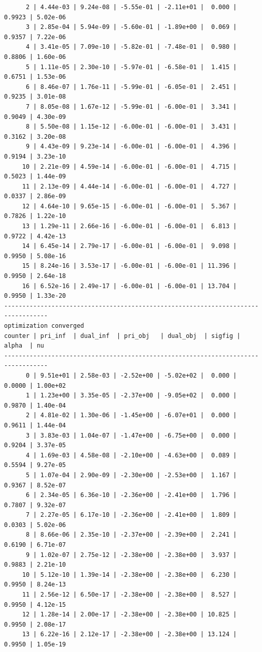 \documentclass[
]{book}
\begin{document}
\begin{verbatim}
      2 | 4.44e-03 | 9.24e-08 | -5.55e-01 | -2.11e+01 |  0.000 | 0.9923 | 5.02e-06
      3 | 2.85e-04 | 5.94e-09 | -5.60e-01 | -1.89e+00 |  0.069 | 0.9357 | 7.22e-06
      4 | 3.41e-05 | 7.09e-10 | -5.82e-01 | -7.48e-01 |  0.980 | 0.8806 | 1.60e-06
      5 | 1.11e-05 | 2.30e-10 | -5.97e-01 | -6.58e-01 |  1.415 | 0.6751 | 1.53e-06
      6 | 8.46e-07 | 1.76e-11 | -5.99e-01 | -6.05e-01 |  2.451 | 0.9235 | 3.01e-08
      7 | 8.05e-08 | 1.67e-12 | -5.99e-01 | -6.00e-01 |  3.341 | 0.9049 | 4.30e-09
      8 | 5.50e-08 | 1.15e-12 | -6.00e-01 | -6.00e-01 |  3.431 | 0.3162 | 3.20e-08
      9 | 4.43e-09 | 9.23e-14 | -6.00e-01 | -6.00e-01 |  4.396 | 0.9194 | 3.23e-10
     10 | 2.21e-09 | 4.59e-14 | -6.00e-01 | -6.00e-01 |  4.715 | 0.5023 | 1.44e-09
     11 | 2.13e-09 | 4.44e-14 | -6.00e-01 | -6.00e-01 |  4.727 | 0.0337 | 2.86e-09
     12 | 4.64e-10 | 9.65e-15 | -6.00e-01 | -6.00e-01 |  5.367 | 0.7826 | 1.22e-10
     13 | 1.29e-11 | 2.66e-16 | -6.00e-01 | -6.00e-01 |  6.813 | 0.9722 | 4.42e-13
     14 | 6.45e-14 | 2.79e-17 | -6.00e-01 | -6.00e-01 |  9.098 | 0.9950 | 5.08e-16
     15 | 8.24e-16 | 3.53e-17 | -6.00e-01 | -6.00e-01 | 11.396 | 0.9950 | 2.64e-18
     16 | 6.52e-16 | 2.49e-17 | -6.00e-01 | -6.00e-01 | 13.704 | 0.9950 | 1.33e-20
----------------------------------------------------------------------------------
optimization converged
counter | pri_inf  | dual_inf  | pri_obj   | dual_obj  | sigfig | alpha  | nu 
----------------------------------------------------------------------------------
      0 | 9.51e+01 | 2.58e-03 | -2.52e+00 | -5.02e+02 |  0.000 | 0.0000 | 1.00e+02
      1 | 1.23e+00 | 3.35e-05 | -2.37e+00 | -9.05e+02 |  0.000 | 0.9870 | 1.40e-04
      2 | 4.81e-02 | 1.30e-06 | -1.45e+00 | -6.07e+01 |  0.000 | 0.9611 | 1.44e-04
      3 | 3.83e-03 | 1.04e-07 | -1.47e+00 | -6.75e+00 |  0.000 | 0.9204 | 3.37e-05
      4 | 1.69e-03 | 4.58e-08 | -2.10e+00 | -4.63e+00 |  0.089 | 0.5594 | 9.27e-05
      5 | 1.07e-04 | 2.90e-09 | -2.30e+00 | -2.53e+00 |  1.167 | 0.9367 | 8.52e-07
      6 | 2.34e-05 | 6.36e-10 | -2.36e+00 | -2.41e+00 |  1.796 | 0.7807 | 9.32e-07
      7 | 2.27e-05 | 6.17e-10 | -2.36e+00 | -2.41e+00 |  1.809 | 0.0303 | 5.02e-06
      8 | 8.66e-06 | 2.35e-10 | -2.37e+00 | -2.39e+00 |  2.241 | 0.6190 | 6.71e-07
      9 | 1.02e-07 | 2.75e-12 | -2.38e+00 | -2.38e+00 |  3.937 | 0.9883 | 2.21e-10
     10 | 5.12e-10 | 1.39e-14 | -2.38e+00 | -2.38e+00 |  6.230 | 0.9950 | 8.24e-13
     11 | 2.56e-12 | 6.50e-17 | -2.38e+00 | -2.38e+00 |  8.527 | 0.9950 | 4.12e-15
     12 | 1.28e-14 | 2.00e-17 | -2.38e+00 | -2.38e+00 | 10.825 | 0.9950 | 2.08e-17
     13 | 6.22e-16 | 2.12e-17 | -2.38e+00 | -2.38e+00 | 13.124 | 0.9950 | 1.05e-19

\end{verbatim}
\end{document}

